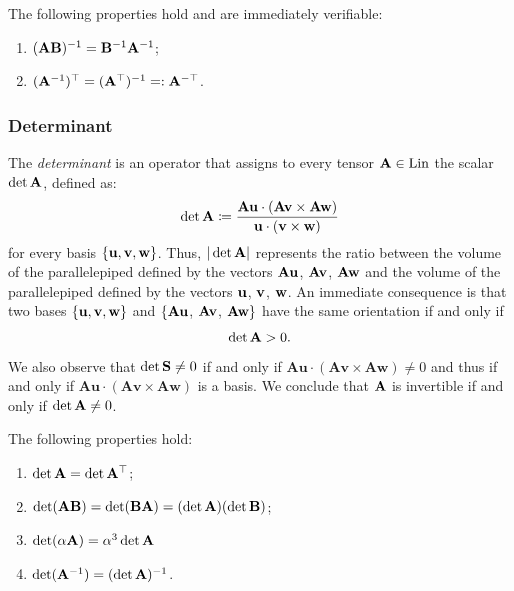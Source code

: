 The following properties hold and are immediately verifiable:
\begin{enumerate}
	\item $(\mathbf{A} \mathbf{B})^{-1}= \mathbf{B}^{-1}\mathbf{A}^{-1}$;
	\item $(\mathbf{A}^{-1})^\top=(\mathbf{A} ^\top)^{-1}=:\mathbf{A}^{-\top}$.
\end{enumerate}

\subsubsection{Determinant}
The \textit{determinant} is an operator that assigns to every tensor $\mathbf{A}\in \operatorname{Lin}$ the scalar $\det \mathbf{A}$, defined as:
\begin{equation}
	\det \mathbf{A} \coloneqq 	\frac{\mathbf{Au}\cdot(\mathbf{Av}\times\mathbf{Aw})}{\mathbf{u}\cdot(\mathbf{v}\times\mathbf{w})}
\end{equation}
for every basis $\{\mathbf{u}, \mathbf{v}, \mathbf{w}\}$. Thus, $|\det\mathbf{A}|$ represents the ratio between the volume of the parallelepiped defined by the vectors $\mathbf{A} \mathbf{u}$, $\mathbf{A}\mathbf{v}$, $\mathbf{A} \mathbf{w}$ and the volume of the parallelepiped defined by the vectors $\mathbf{u}$, $\mathbf{v}$, $\mathbf{w}$. An immediate consequence is that two bases $\{\mathbf{u}, \mathbf{v}, \mathbf{w}\}$ and $\{\mathbf{A} \mathbf{u}$, $\mathbf{A}\mathbf{v}$, $\mathbf{A} \mathbf{w}\}$ have the same orientation if and only if
\begin{equation}
	\det \mathbf{A} >0.
\end{equation}
We also observe that $\det \mathbf{S} \neq 0$ if and only if  $\mathbf{Au}\cdot(\mathbf{Av}\times\mathbf{Aw})\neq 0$ and thus if and only if $\mathbf{Au}\cdot(\mathbf{Av}\times\mathbf{Aw})$ is a basis. We conclude that $\mathbf{A}$ is invertible if and only if $\det \mathbf{A} \neq 0$.

The following properties hold:
\begin{enumerate}
	\item $\det \mathbf{A} =\det \mathbf{A} ^\top$;
	\item $\det (\mathbf{A} \mathbf{B})=\det (\mathbf{B} \mathbf{A})=(\det \mathbf{A})(\det \mathbf{B})$;
	\item $\det(\alpha \mathbf{A})=\alpha^3 \det \mathbf{A}$
	\item $\det (\mathbf{A}^{-1})=(\det \mathbf{A})^{-1}$.
\end{enumerate}

